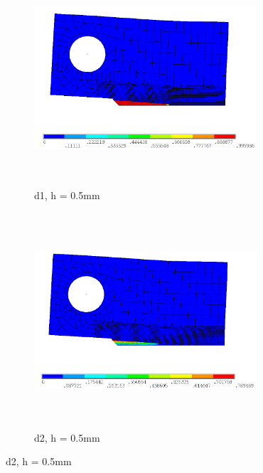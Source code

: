 \documentclass[a4paper,12pt,twoside]{report}
\begin{document}
\FloatBarrier
\begin{figure}[htbp!]\ContinuedFloat 
     \begin{subfigure}{0.4\textwidth}
         \centering
         \includegraphics[width=8.25cm,height=8cm,keepaspectratio]{26.d1-0.5.png}
         \caption{d1, h = 0.5mm}
         \label{fig:d1-0.5}
     \end{subfigure}   
     \hspace{1.8cm}
     \begin{subfigure}{0.4\textwidth}
         \centering
         \includegraphics[width=8.3cm,height=8cm,keepaspectratio]{26.d2-0.5.png}
         \caption{d2, h = 0.5mm}
         \label{fig:d2-0.5}
     \end{subfigure}
\end{figure}
\FloatBarrier
\end{document}
